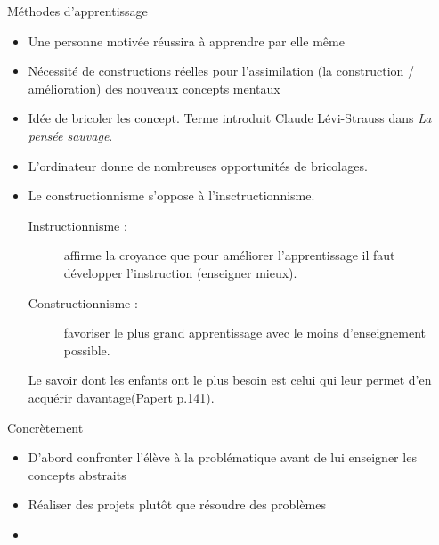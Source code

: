 \begin{frame}
\end{frame}

\begin{frame}{Méthodes d'apprentissage}
\begin{itemize}
  \item Une personne motivée réussira à apprendre par elle même
  \item Nécessité de constructions réelles pour l'assimilation (la construction / amélioration) des nouveaux concepts mentaux
  \item Idée de bricoler les concept. Terme introduit Claude Lévi-Strauss dans \textit{La pensée sauvage}. %
  \item L'ordinateur donne de nombreuses opportunités de bricolages.
  \item Le constructionnisme s'oppose à l'insctructionnisme.
  \begin{description}
    \item[Instructionnisme : ]affirme la croyance que pour améliorer l'apprentissage il faut développer l'instruction (enseigner mieux).
    \item[Constructionnisme : ]favoriser le plus grand apprentissage avec le moins d'enseignement possible.
    \end{description}
    \og{}Le savoir dont les enfants ont le plus besoin est celui qui leur permet d'en acquérir davantage\fg (Papert p.141).
\end{itemize}
\end{frame}

\begin{frame}{Concrètement}
\begin{itemize}
  \item D'abord confronter l'élève à la problématique avant de lui enseigner les concepts abstraits
  \item Réaliser des projets plutôt que résoudre des problèmes
  \item 
\end{itemize}
\end{frame}